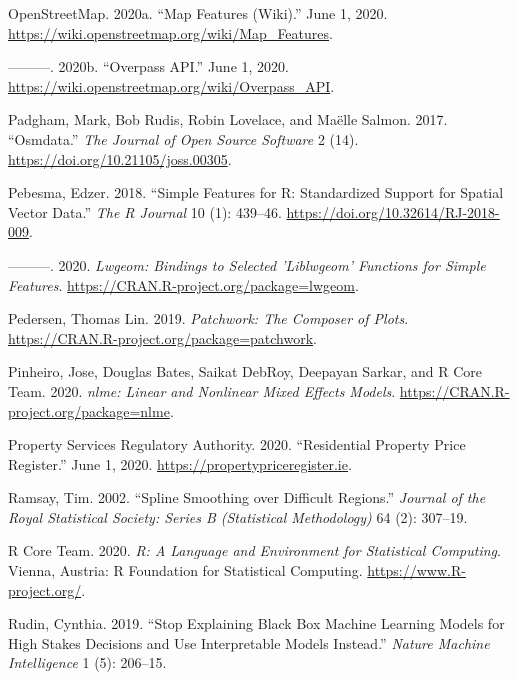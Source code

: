 \documentclass[conference,final,]{IEEEtran}
\newlength{\cslhangindent}
\newenvironment{cslreferences}%
  {\setlength{\parindent}{0pt}%
  \everypar{\setlength{\hangindent}{\cslhangindent}}\ignorespaces}%
  {\par}
\begin{document}
\begin{cslreferences}
\leavevmode\hypertarget{ref-openstreetmap2020}{}%
OpenStreetMap. 2020a. ``Map Features (Wiki).'' June 1, 2020. \url{https://wiki.openstreetmap.org/wiki/Map_Features}.

\leavevmode\hypertarget{ref-wiki2010overpass}{}%
---------. 2020b. ``Overpass API.'' June 1, 2020. \url{https://wiki.openstreetmap.org/wiki/Overpass_API}.

\leavevmode\hypertarget{ref-R-osmdata}{}%
Padgham, Mark, Bob Rudis, Robin Lovelace, and Maëlle Salmon. 2017. ``Osmdata.'' \emph{The Journal of Open Source Software} 2 (14). \url{https://doi.org/10.21105/joss.00305}.

\leavevmode\hypertarget{ref-R-sf}{}%
Pebesma, Edzer. 2018. ``Simple Features for R: Standardized Support for Spatial Vector Data.'' \emph{The R Journal} 10 (1): 439--46. \url{https://doi.org/10.32614/RJ-2018-009}.

\leavevmode\hypertarget{ref-R-lwgeom}{}%
---------. 2020. \emph{Lwgeom: Bindings to Selected 'Liblwgeom' Functions for Simple Features}. \url{https://CRAN.R-project.org/package=lwgeom}.

\leavevmode\hypertarget{ref-R-patchwork}{}%
Pedersen, Thomas Lin. 2019. \emph{Patchwork: The Composer of Plots}. \url{https://CRAN.R-project.org/package=patchwork}.

\leavevmode\hypertarget{ref-R-nlme}{}%
Pinheiro, Jose, Douglas Bates, Saikat DebRoy, Deepayan Sarkar, and R Core Team. 2020. \emph{nlme: Linear and Nonlinear Mixed Effects Models}. \url{https://CRAN.R-project.org/package=nlme}.

\leavevmode\hypertarget{ref-rppr2020}{}%
Property Services Regulatory Authority. 2020. ``Residential Property Price Register.'' June 1, 2020. \url{https://propertypriceregister.ie}.

\leavevmode\hypertarget{ref-ramsay2002spline}{}%
Ramsay, Tim. 2002. ``Spline Smoothing over Difficult Regions.'' \emph{Journal of the Royal Statistical Society: Series B (Statistical Methodology)} 64 (2): 307--19.

\leavevmode\hypertarget{ref-R-base}{}%
R Core Team. 2020. \emph{R: A Language and Environment for Statistical Computing}. Vienna, Austria: R Foundation for Statistical Computing. \url{https://www.R-project.org/}.

\leavevmode\hypertarget{ref-rudin2019stop}{}%
Rudin, Cynthia. 2019. ``Stop Explaining Black Box Machine Learning Models for High Stakes Decisions and Use Interpretable Models Instead.'' \emph{Nature Machine Intelligence} 1 (5): 206--15.


\end{cslreferences}
\end{document}
